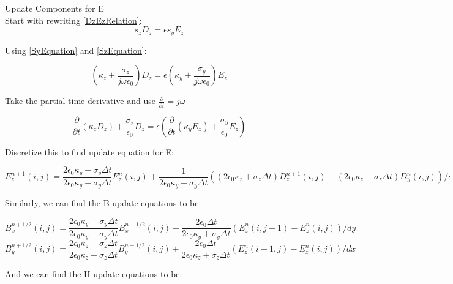 \documentclass{article}
\begin{document}
 
 Update Components for E\\

 Start with rewriting \ref{DzEzRelation}:
 \begin{equation}s_{z}D_{z}=\epsilon s_{y}E_{z}\end{equation}

 Using \ref{SyEquation} and \ref{SzEquation}:

 \begin{equation}(\kappa_{z}+\frac{\sigma_{z}}{j\omega\epsilon_{0}})D_{z}=\epsilon
   (\kappa_{y}+\frac{\sigma_{y}}{j\omega\epsilon_{0}})E_{z}\end{equation}

 Take the partial time derivative and use $\frac{\partial}{\partial t}= j \omega$
 
 \begin{equation}
   \frac{\partial}{\partial t}(\kappa_{z}D_{z})+\frac{\sigma_{z}}{\epsilon_{0}}D_{z}=
   \epsilon(\frac{\partial}{\partial t}(\kappa_{y}E_{z})+\frac{\sigma_{y}}{\epsilon_{0}}E_{z})
 \end{equation}

 Discretize this to find update equation for E:

 \begin{equation}
 E_{z}^{n+1}(i,j) = \frac{2\epsilon_{0}\kappa_{y}-\sigma_{y}\Delta t}{2\epsilon_{0}\kappa_{y}+\sigma_{y}\Delta t} E_{z}^{n}(i,j)+\frac{1}{2\epsilon_{0}\kappa_{y}+\sigma_{y}\Delta t}  ((2\epsilon_{0}\kappa_{z}+\sigma_{z}\Delta t) D_{z}^{n+1}(i,j)-(2\epsilon_{0}\kappa_{z}-\sigma_{z}\Delta t) D_{y}^{n}(i,j))/\epsilon
 \end{equation}
 
 Similarly, we can find the B update equations to be:

 \begin{equation}
 B_{x}^{n+1/2}(i,j) = \frac{2\epsilon_{0}\kappa_{y}-\sigma_{y}\Delta t}{2\epsilon_{0}\kappa_{y}+\sigma_{y}\Delta t}  B_{x}^{n-1/2}(i,j) + \frac{2\epsilon_{0}\Delta t}{2\epsilon_{0}\kappa_{y}+\sigma_{y}\Delta t}  (E_{z}^{n}(i,j+1)-E_{z}^{n}(i,j))/dy
 \end{equation}
 \begin{equation}
 B_{y}^{n+1/2}(i,j) = \frac{2\epsilon_{0}\kappa_{z}-\sigma_{z}\Delta t}{2\epsilon_{0}\kappa_{z}+\sigma_{z}\Delta t}  B_{y}^{n-1/2}(i,j) + \frac{2\epsilon_{0}\Delta t}{2\epsilon_{0}\kappa_{z}+\sigma_{z}\Delta t}  (E_{z}^{n}(i+1,j)-E_{z}^{n}(i,j))/dx
 \end{equation}

 And we can find the H update equations to be:
\end{document}
